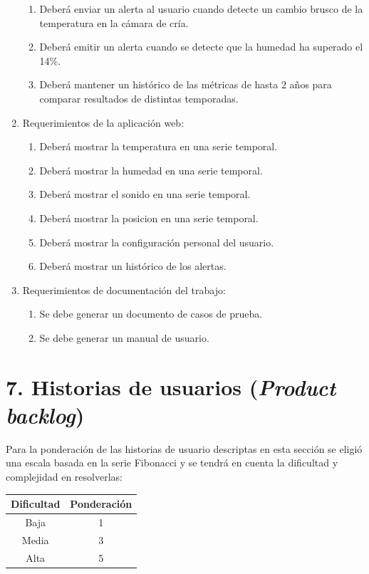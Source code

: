 \documentclass[
11pt, %
codirector, %
]{charter}
\begin{document}
\begin{enumerate}
\begin{enumerate}
			\item Deberá enviar un alerta al usuario cuando detecte un cambio brusco de la temperatura en la cámara de cría.
			\item Deberá emitir un alerta cuando se detecte que la humedad ha superado el 14\%.
			\item Deberá mantener un histórico de las métricas de hasta 2 años para comparar resultados de distintas temporadas.
		\end{enumerate}
	\item Requerimientos de la aplicación web:
		\begin{enumerate}		
			\item Deberá mostrar la temperatura en una serie temporal.
			\item Deberá mostrar la humedad en una serie temporal.
			\item Deberá mostrar el sonido en una serie temporal.	
			\item Deberá mostrar la posicion en una serie temporal.
			\item Deberá mostrar la configuración personal del usuario.
			\item Deberá mostrar un histórico de los alertas.
		\end{enumerate}
	\item Requerimientos de documentación del trabajo:
		\begin{enumerate}
			\item Se debe generar un documento de casos de prueba.
			\item Se debe generar un manual de usuario.
		\end{enumerate}	
\end{enumerate}


\section{7. Historias de usuarios (\textit{Product backlog})}
\label{sec:backlog}

Para la ponderación de las historias de usuario descriptas en esta sección se eligió una escala basada en la serie Fibonacci y se tendrá en cuenta la dificultad y complejidad en resolverlas:

\begin{tabular}{|c|c|}
\hline
\rowcolor[HTML]{C0C0C0} 
Dificultad & Ponderación \\ \hline
Baja      & 1 \\ \hline
Media      & 3 \\ \hline
Alta      & 5 \\ \hline
\end{tabular}
\end{document}
